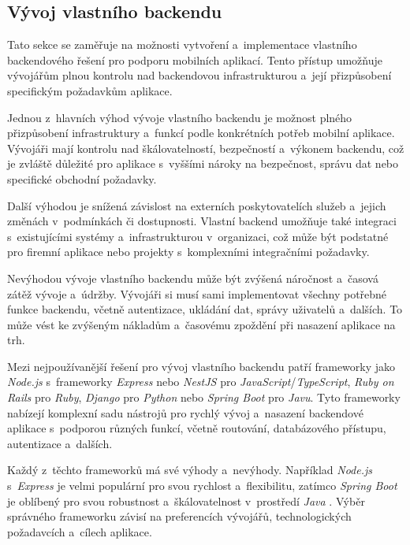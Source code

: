 \subsection{Vývoj vlastního backendu}

Tato sekce se zaměřuje na možnosti vytvoření a~implementace vlastního backendového řešení pro podporu mobilních aplikací. Tento přístup umožňuje vývojářům plnou kontrolu nad backendovou infrastrukturou a~její přizpůsobení specifickým požadavkům aplikace.

Jednou z~hlavních výhod vývoje vlastního backendu je možnost plného přizpůsobení infrastruktury a~funkcí podle konkrétních potřeb mobilní aplikace. Vývojáři mají kontrolu nad škálovatelností, bezpečností a~výkonem backendu, což je zvláště důležité pro aplikace s~vyššími nároky na bezpečnost, správu dat nebo specifické obchodní požadavky.

Další výhodou je snížená závislost na externích poskytovatelích služeb a~jejich změnách v~podmínkách či dostupnosti. Vlastní backend umožňuje také integraci s~existujícími systémy a~infrastrukturou v~organizaci, což může být podstatné pro firemní aplikace nebo projekty s~komplexními integračními požadavky.

Nevýhodou vývoje vlastního backendu může být zvýšená náročnost a~časová zátěž vývoje a~údržby. Vývojáři si musí sami implementovat všechny potřebné funkce backendu, včetně autentizace, ukládání dat, správy uživatelů a~dalších. To může vést ke zvýšeným nákladům a~časovému zpoždění při nasazení aplikace na trh.

Mezi nejpoužívanější řešení pro vývoj vlastního backendu patří frameworky jako \emph{Node.js} \cite{node-js} s~frameworky \emph{Express} \cite{node-js-express} nebo \emph{NestJS} \cite{nest-js} pro \emph{JavaScript}/\emph{TypeScript}, \emph{Ruby on Rails} \cite{ruby-on-rails} pro \emph{Ruby}, \emph{Django} \cite{django} pro \emph{Python} nebo \emph{Spring Boot} \cite{spring-boot} pro \emph{Javu}. Tyto frameworky nabízejí komplexní sadu nástrojů pro rychlý vývoj a~nasazení backendové aplikace s~podporou různých funkcí, včetně routování, databázového přístupu, autentizace a~dalších.

Každý z~těchto frameworků má své výhody a~nevýhody. Například \emph{Node.js} s~\emph{Express} je velmi populární pro svou rychlost a~flexibilitu, zatímco \emph{Spring Boot} je oblíbený pro svou robustnost a~škálovatelnost v~prostředí \emph{Java} \cite{spring-boot-vs-node-js}. Výběr správného frameworku závisí na preferencích vývojářů, technologických požadavcích a~cílech aplikace.

